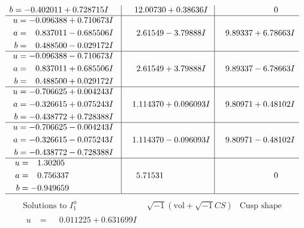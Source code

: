 \documentclass[1p]{elsarticle_modified}
\theoremstyle{definition}
\newcommand{\I}{\sqrt{-1}}
\begin{document}
$$\begin{array}{c|c|c}
\begin{aligned}
b &= -0.402011 + 0.728715 I\end{aligned}
 & \phantom{-}12.00730 + 0.38636 I & \phantom{-0.000000 } 0 \\ \hline\begin{aligned}
u &= -0.096388 + 0.710673 I \\
a &= \phantom{-}0.837011 - 0.685506 I \\
b &= \phantom{-}0.488500 - 0.029172 I\end{aligned}
 & \phantom{-}2.61549 - 3.79888 I & \phantom{-}9.89337 + 6.78663 I \\ \hline\begin{aligned}
u &= -0.096388 - 0.710673 I \\
a &= \phantom{-}0.837011 + 0.685506 I \\
b &= \phantom{-}0.488500 + 0.029172 I\end{aligned}
 & \phantom{-}2.61549 + 3.79888 I & \phantom{-}9.89337 - 6.78663 I \\ \hline\begin{aligned}
u &= -0.706625 + 0.004243 I \\
a &= -0.326615 + 0.075243 I \\
b &= -0.438772 + 0.728388 I\end{aligned}
 & \phantom{-}1.114370 + 0.096093 I & \phantom{-}9.80971 + 0.48102 I \\ \hline\begin{aligned}
u &= -0.706625 - 0.004243 I \\
a &= -0.326615 - 0.075243 I \\
b &= -0.438772 - 0.728388 I\end{aligned}
 & \phantom{-}1.114370 - 0.096093 I & \phantom{-}9.80971 - 0.48102 I \\ \hline\begin{aligned}
u &= \phantom{-}1.30205\phantom{ +0.000000I} \\
a &= \phantom{-}0.756337\phantom{ +0.000000I} \\
b &= -0.949659\phantom{ +0.000000I}\end{aligned}
 & \phantom{-}5.71531\phantom{ +0.000000I} & \phantom{-0.000000 } 0\\
 \hline 
 \end{array}$$\newpage$$\begin{array}{c|c|c}  
\text{Solutions to }I^u_{1}& \I (\text{vol} + \sqrt{-1}CS) & \text{Cusp shape}\\
 \hline 
\begin{aligned}
u &= \phantom{-}0.011225 + 0.631699 I \\

\end{aligned}
\end{array}$$
\end{document}
